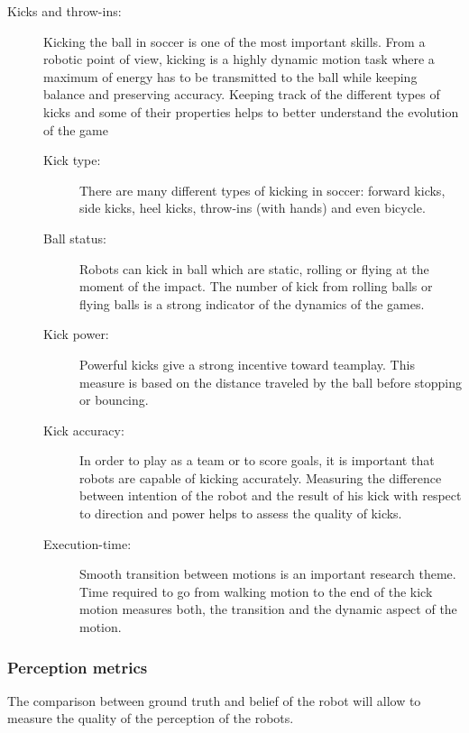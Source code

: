 \documentclass{article}
\begin{document}
\begin{description}
\item[Kicks and throw-ins:] Kicking the ball in soccer is one of the most important
  skills.
  From a robotic point of view, kicking is a highly dynamic motion task where
  a maximum of energy has to be transmitted to the ball while keeping balance
  and preserving accuracy.
  Keeping track of the different types of kicks and some of their properties helps
  to better understand the evolution of the game
  \begin{description}
  \item[Kick type:] There are many different types of kicking in soccer:
    forward kicks, side kicks, heel kicks, throw-ins (with hands) and even bicycle.
  \item[Ball status:] Robots can kick in ball which are static, rolling or
    flying at the moment of the impact.
    The number of kick from rolling balls or flying balls is a strong indicator
    of the dynamics of the games.
  \item[Kick power:] Powerful kicks give a strong incentive toward teamplay.
    This measure is based on the distance traveled by the ball before stopping or bouncing.
  \item[Kick accuracy:] In order to play as a team or to score goals, it is
    important that robots are capable of kicking accurately.
    Measuring the difference between intention of the robot and the result of his kick with
    respect to direction and power helps to assess the quality of kicks.
  \item[Execution-time:] Smooth transition between motions is an important research theme.
    Time required to go from walking motion to the end of the kick motion measures both,
    the transition and the dynamic aspect of the motion.
  \end{description}
\end{description}


\subsubsection{Perception metrics}

The comparison between ground truth and belief of the robot will allow to measure
the quality of the perception of the robots.
\end{document}
